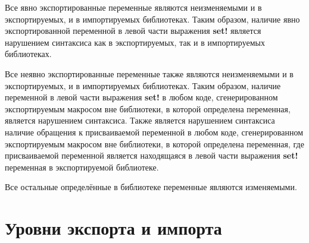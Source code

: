 \label{importsareimmutablesection}
Все явно экспортированные переменные являются неизменяемыми и в экспортируемых, и в импортируемых
библиотеках. Таким образом, наличие явно экспортированной переменной в левой части выражения
{\cf\bfseries set!} является нарушением синтаксиса как в экспортируемых, так и в импортируемых
библиотеках.\vspace{-1.2mm}

Все неявно экспортированные переменные также являются неизменяемыми и в экспортируемых, и в
импортируемых библиотеках. Таким образом, наличие переменной в левой части выражения
{\cf\bfseries set!} в любом коде, сгенерированном экспортируемым макросом вне библиотеки, в
которой определена переменная, является нарушением синтаксиса. Также является нарушением
синтаксиса наличие обращения к присваиваемой переменной в любом коде, сгенерированном
экспортируемым макросом вне библиотеки, в которой определена переменная, где присваиваемой
переменной является находящаяся в левой части выражения {\cf\bfseries set!} переменная в
экспортируемой библиотеке.\vspace{-1.2mm}

Все остальные определённые в библиотеке переменные являются изменяемыми.\vspace{-6mm}

\section{Уровни экспорта и импорта}\vspace{-3.8mm}
\label{phasessection}

